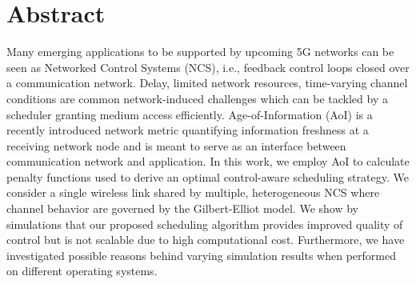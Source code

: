 \thispagestyle{plain}

\section*{Abstract}
Many emerging applications to be supported by upcoming 5G networks can be seen
as Networked Control Systems (NCS), i.e., feedback control loops closed over a
communication network. Delay, limited network resources, time-varying channel
conditions are common network-induced challenges which can be tackled by a
scheduler granting medium access efficiently. Age-of-Information (AoI) is a
recently introduced network metric quantifying information freshness at a
receiving network node and is meant to serve as an interface between
communication network and application. In this work, we employ AoI to calculate
penalty functions used to derive an optimal control-aware scheduling strategy.
We consider a single wireless link shared by multiple, heterogeneous NCS where
channel behavior are governed by the Gilbert-Elliot model. We show by
simulations that our proposed scheduling algorithm provides improved quality of
control but is not scalable due to high computational cost. Furthermore, we have
investigated possible reasons behind varying simulation results when performed
on different operating systems.
